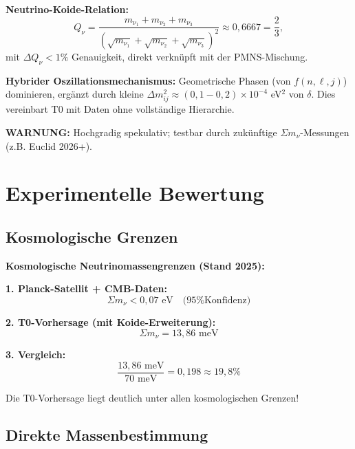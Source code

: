 \begin{koidebox}
		\textbf{Neutrino-Koide-Relation:}
		\begin{equation}
			Q_\nu = \frac{m_{\nu_1} + m_{\nu_2} + m_{\nu_3}}{\left( \sqrt{m_{\nu_1}} + \sqrt{m_{\nu_2}} + \sqrt{m_{\nu_3}} \right)^2} \approx 0,6667 = \frac{2}{3},
		\end{equation}
		mit $\Delta Q_\nu < 1\%$ Genauigkeit, direkt verknüpft mit der PMNS-Mischung.
		
		\textbf{Hybrider Oszillationsmechanismus:}
		Geometrische Phasen (von $f(n,\ell,j)$) dominieren, ergänzt durch kleine $\Delta m^2_{ij} \approx (0,1-0,2) \times 10^{-4}$ eV$^2$ von $\delta$. Dies vereinbart T0 mit Daten ohne vollständige Hierarchie.
		
		\textbf{WARNUNG:} Hochgradig spekulativ; testbar durch zukünftige $\Sigma m_\nu$-Messungen (z.B. Euclid 2026+).
	\end{koidebox}
	
	\section{Experimentelle Bewertung}
	
	\subsection{Kosmologische Grenzen}
	
	\begin{experimental}
		\textbf{Kosmologische Neutrinomassengrenzen (Stand 2025):}
		
		\textbf{1. Planck-Satellit + CMB-Daten:}
		\begin{equation}
			\Sigma m_\nu < 0,07 \text{ eV} \quad \text{(95\% Konfidenz)}
		\end{equation}
		
		\textbf{2. T0-Vorhersage (mit Koide-Erweiterung):}
		\begin{equation}
			\Sigma m_\nu = 13,86 \text{ meV}
		\end{equation}
		
		\textbf{3. Vergleich:}
		\begin{equation}
			\frac{13,86 \text{ meV}}{70 \text{ meV}} = 0,198 \approx 19,8\%
		\end{equation}
		
		Die T0-Vorhersage liegt deutlich unter allen kosmologischen Grenzen!
	\end{experimental}
	
	\subsection{Direkte Massenbestimmung}
	

